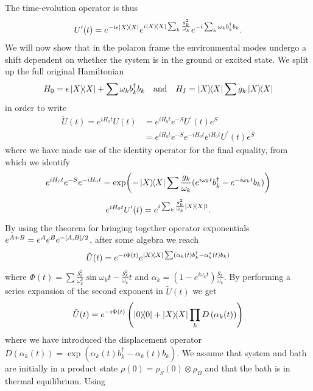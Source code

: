 \documentclass[]{article}
\begin{document}
\begin{itemize}
\begin{itemize}
The time-evolution operator is thus
\begin{equation}
U^{\prime}(t) = e^{-i\epsilon\dyad{X}} e^{i\dyad{X}\sum_{k}\frac{g^2_k}{\omega_k}} e^{-i\sum_{k}\omega_k b_k^{\dagger}b_k}.
\end{equation}
We will now show that in the polaron frame the environmental modes undergo a shift dependent on whether the system is in the ground or excited state. We split up the full original  Hamiltonian
\begin{equation}
H_0 = \epsilon \dyad{X} + \sum \omega_k b_k^{\dagger}b_k \quad \textnormal{and} \quad H_I = \dyad{X}\sum g_k \dyad{X}
\end{equation}
in order to write 
\begin{align}
\tilde{U}(t) = e^{i H_0 t}U(t) &= e^{i H_0 t}e^{-S}U^{\prime}(t)e^{S} \\
&= e^{i H_0 t}e^{-S}e^{-i H_0 t}e^{i H_0 t}U^{\prime}(t)e^{S}
\end{align}
where we have made use of the identity operator for the final equality, from which we identify
\begin{equation}
e^{i H_0 t}e^{-S}e^{-i H_0 t} = \exp(-\dyad{X}\sum\frac{g_k}{\omega_k}(e^{i\omega_k t}b_k^{\dagger} - e^{-i\omega_k t}b_k))
\end{equation}
\begin{equation}
e^{i H_0 t}U^{\prime}(t) = e^{i\sum_{k}\frac{g^2_k}{\omega_k}\dyad{X}t}.
\end{equation}
By using the theorem for bringing together operator exponentials $e^{A+B} = e^{A}e^Be^{-\comm{A}{B}/2}$, after some algebra we reach
\begin{equation}
\label{eq:compactTimeEvOp}
\tilde{U}(t) = e^{-i\Phi(t)}e^{\dyad{X}\sum(\alpha_k(t)b_k^{\dagger}-\alpha_k^*(t)b_k)}
\end{equation}
where $\Phi(t) = \sum\frac{g^2_k}{\omega_k^2}\sin{\omega_k t}-\frac{g_k^2}{\omega_k}t$ and $\alpha_k=(1-e^{i\omega_k t})\frac{g_k}{\omega_k}$. By performing a series expansion of the second exponent in $\tilde{U}(t)$ we get
\begin{equation}
\tilde{U}(t) = e^{-i\Phi(t)}\left(\dyad{0} + \dyad{X}\prod_{k} D\left(\alpha_k(t)\right)\right) 
\end{equation}
where we have introduced the displacement operator $D(\alpha_k(t))=\exp(\alpha_k(t)b_k^{\dagger}-\alpha_k(t)b_k)$. We assume that system and bath are initially in a product state $\rho(0) = \rho_S(0)\otimes\rho_B$ and that the bath is in thermal equilibrium. Using
\begin{equation}

\end{equation}
\end{itemize}
\end{itemize}
\end{document}
